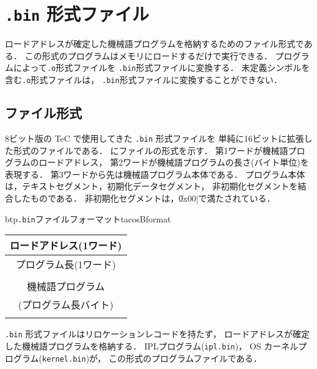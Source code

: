 \section{\texttt{.bin} 形式ファイル}
ロードアドレスが確定した機械語プログラムを格納するためのファイル形式である．
この形式のプログラムはメモリにロードするだけで実行できる．
{\objbin}プログラムによって\texttt{.o}形式ファイルを
\texttt{.bin}形式ファイルに変換する．
未定義シンボルを含む\texttt{.o}形式ファイルは，
\texttt{.bin}形式ファイルに変換することができない．

\subsection{ファイル形式}
8ビット版の TeC で使用してきた \texttt{.bin} 形式ファイルを
単純に16ビットに拡張した形式のファイルである．
にファイルの形式を示す．
第1ワードが機械語プログラムのロードアドレス，
第2ワードが機械語プログラムの長さ(バイト単位)を表現する．
第3ワードから先は機械語プログラム本体である．
プログラム本体は，テキストセグメント，初期化データセグメント，
非初期化セグメントを結合したものである．
非初期化セグメントは，\|0x00|で満たされている．

\begin{myfig}{btp}{\texttt{.bin}ファイルフォーマット}{tacosBformat}
  \begin{tabular}{|c|}
    \hline
    ロードアドレス(1ワード) \\\hline
    プログラム長(1ワード) \\\hline
    \\
    機械語プログラム \\
    (プログラム長バイト)\\
    \\\hline
  \end{tabular}
\end{myfig}

\texttt{.bin} 形式ファイルはリロケーションレコードを持たず，
ロードアドレスが確定した機械語プログラムを格納する．
IPLプログラム(\texttt{ipl.bin})，
OS カーネルプログラム(\texttt{kernel.bin})が，
この形式のプログラムファイルである．
